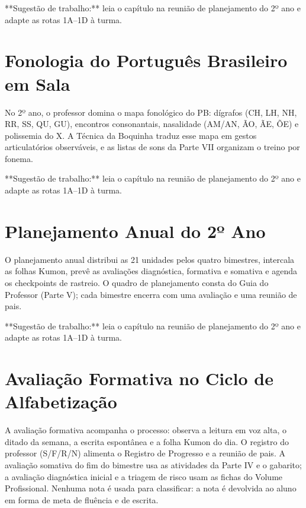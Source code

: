 \begin{dica}
**Sugestão de trabalho:** leia o capítulo na reunião de planejamento do 2º ano e adapte as rotas 1A–1D à turma.
\end{dica}

\chapter{Fonologia do Português Brasileiro em Sala}

No 2º ano, o professor domina o mapa fonológico do PB: dígrafos (CH, LH, NH, RR, SS, QU, GU), encontros consonantais, nasalidade (AM/AN, ÃO, ÃE, ÕE) e polissemia do X. A Técnica da Boquinha traduz esse mapa em gestos articulatórios observáveis, e as listas de sons da Parte VII organizam o treino por fonema.


\begin{dica}
**Sugestão de trabalho:** leia o capítulo na reunião de planejamento do 2º ano e adapte as rotas 1A–1D à turma.
\end{dica}

\chapter{Planejamento Anual do 2º Ano}

O planejamento anual distribui as 21 unidades pelos quatro bimestres, intercala as folhas Kumon, prevê as avaliações diagnóstica, formativa e somativa e agenda os checkpoints de rastreio. O quadro de planejamento consta do Guia do Professor (Parte V); cada bimestre encerra com uma avaliação e uma reunião de pais.


\begin{dica}
**Sugestão de trabalho:** leia o capítulo na reunião de planejamento do 2º ano e adapte as rotas 1A–1D à turma.
\end{dica}

\chapter{Avaliação Formativa no Ciclo de Alfabetização}

A avaliação formativa acompanha o processo: observa a leitura em voz alta, o ditado da semana, a escrita espontânea e a folha Kumon do dia. O registro do professor (S/F/R/N) alimenta o Registro de Progresso e a reunião de pais. A avaliação somativa do fim do bimestre usa as atividades da Parte IV e o gabarito; a avaliação diagnóstica inicial e a triagem de risco usam as fichas do Volume Profissional. Nenhuma nota é usada para classificar: a nota é devolvida ao aluno em forma de meta de fluência e de escrita.


